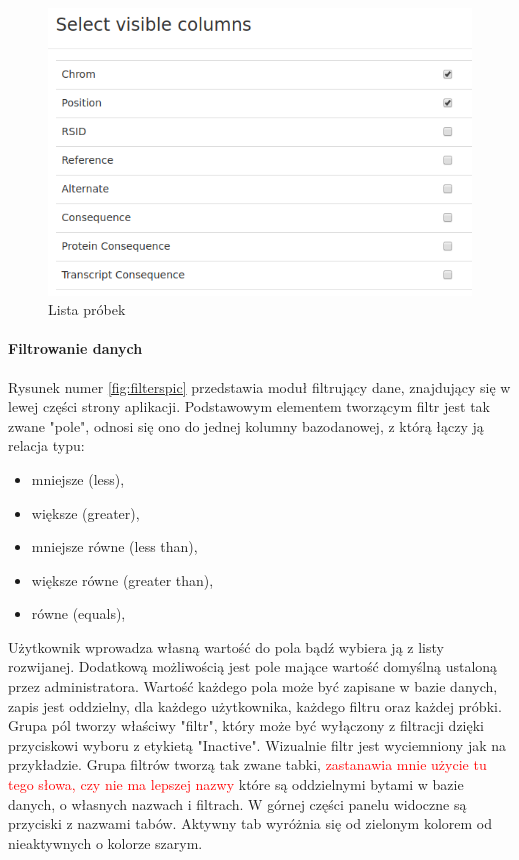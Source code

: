 \documentclass[a4paper,12pt,twoside]{article}
\begin{document}
\begin{figure}[h!]
  \includegraphics[width=\linewidth]{obrazy/aplikacja/visible_columns.png}
  \caption{Lista próbek}
  \label{fig:visible_columnspic}
\end{figure}
\newpage

\paragraph{Filtrowanie danych}
Rysunek numer \ref{fig:filterspic} przedstawia moduł filtrujący dane, znajdujący się w
lewej części strony aplikacji.
Podstawowym elementem tworzącym filtr jest tak zwane "pole", odnosi się ono do jednej kolumny
bazodanowej, z którą łączy ją relacja typu: 

\begin{itemize}
\item mniejsze (less),
\item większe (greater),
\item mniejsze równe (less than),
\item większe równe (greater than),
\item równe (equals),
\end{itemize} 

Użytkownik wprowadza własną wartość do pola bądź wybiera ją z listy rozwijanej.   
Dodatkową możliwością jest pole mające wartość domyślną ustaloną przez administratora. 
Wartość każdego pola może być zapisane w bazie danych, zapis jest oddzielny, dla każdego 
użytkownika, każdego filtru oraz każdej próbki.
Grupa pól tworzy właściwy "filtr", który może być wyłączony z filtracji dzięki
przyciskowi wyboru z etykietą "Inactive". Wizualnie filtr jest wyciemniony jak na przykładzie.
Grupa filtrów tworzą tak zwane tabki, \textcolor{red}{zastanawia mnie użycie tu tego słowa, czy nie ma lepszej nazwy} które są oddzielnymi bytami w bazie danych, o własnych nazwach i filtrach.
W górnej części panelu widoczne są przyciski z nazwami tabów. Aktywny tab
wyróżnia się od zielonym kolorem od nieaktywnych o kolorze szarym. 
\end{document}
